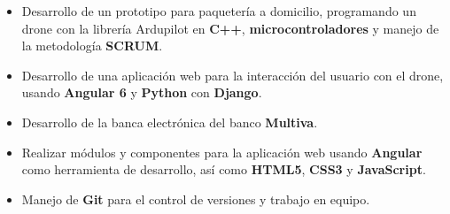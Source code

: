 \documentclass[letterpaper]{twentysecondcv} %
\begin{document}
\divider

\begin{itemize}
	\item Desarrollo de un prototipo para paquetería a domicilio, programando un drone con la librería Ardupilot en \textbf{C++}, \textbf{microcontroladores} y manejo de la metodología \textbf{SCRUM}.
	\item Desarrollo de una aplicación web para la interacción del usuario con el drone,  usando \textbf{Angular 6} y \textbf{Python} con \textbf{Django}.
\end{itemize}

\divider

\begin{itemize}
	\item Desarrollo de la banca electrónica del banco \textbf{Multiva}.
	\item Realizar módulos y componentes para la aplicación web usando \textbf{Angular} como herramienta de desarrollo, así como \textbf{HTML5}, \textbf{CSS3} y \textbf{JavaScript}.
	\item Manejo de \textbf{Git} para el control de versiones y trabajo en equipo.
\end{itemize}



\end{document}
